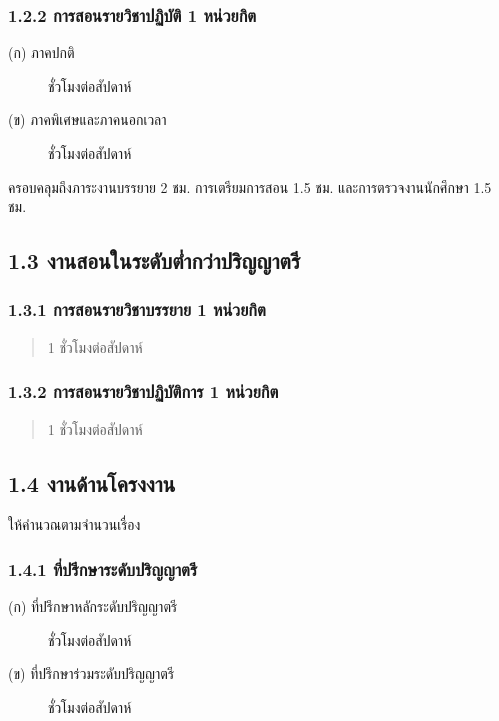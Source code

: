 \documentclass[a4paper,12pt,english]{sphinxmanual}
\begin{document}
\subsubsection{1.2.2 การสอนรายวิชาปฏิบัติ 1 หน่วยกิต}
\label{\detokenize{workload_rubric:id11}}\begin{description}
\item[{(ก) ภาคปกติ}]  ชั่วโมงต่อสัปดาห์

\item[{(ข) ภาคพิเศษและภาคนอกเวลา}]  ชั่วโมงต่อสัปดาห์

\end{description}

ครอบคลุมถึงภาระงานบรรยาย 2 ชม.
การเตรียมการสอน 1.5 ชม. และการตรวจงานนักศึกษา 1.5 ชม.


\subsection{1.3 งานสอนในระดับต่ำกว่าปริญญาตรี}
\label{\detokenize{workload_rubric:id12}}

\subsubsection{1.3.1 การสอนรายวิชาบรรยาย 1 หน่วยกิต}
\label{\detokenize{workload_rubric:id13}}\begin{quote}

1 ชั่วโมงต่อสัปดาห์
\end{quote}


\subsubsection{1.3.2 การสอนรายวิชาปฏิบัติการ 1 หน่วยกิต}
\label{\detokenize{workload_rubric:id14}}\begin{quote}

1 ชั่วโมงต่อสัปดาห์
\end{quote}


\subsection{1.4 งานด้านโครงงาน}
\label{\detokenize{workload_rubric:id15}}
ให้คำนวณตามจำนวนเรื่อง


\subsubsection{1.4.1 ที่ปรึกษาระดับปริญญาตรี}
\label{\detokenize{workload_rubric:id16}}\begin{description}
\item[{(ก) ที่ปรึกษาหลักระดับปริญญาตรี}]  ชั่วโมงต่อสัปดาห์

\item[{(ข) ที่ปรึกษาร่วมระดับปริญญาตรี}]  ชั่วโมงต่อสัปดาห์

\end{description}
\end{document}

